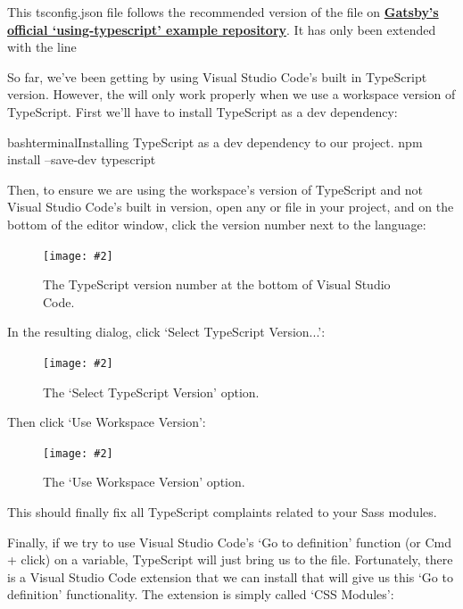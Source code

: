 \documentclass[a4paper,headinclude=on,footinclude=on,12pt,oneside]{scrbook}
\newcommand{\link}[2]{\textbf{\textcolor{monokaiPink}{\href{#2}{#1}}}}
\newcommand{\standardfigure}[3]{\begin{figure}[H]\begin{center}\texttt{[image: \#2]}\caption{#3}\label{fig:#2}\end{center}\end{figure}}
\begin{document}
This tsconfig.json file follows the recommended version of the file on \link{Gatsby's official `using-typescript' example repository}{https://github.com/gatsbyjs/gatsby/blob/master/examples/using-typescript/tsconfig.json}. It has only been extended with the  line 


So far, we've been getting by using Visual Studio Code's built in TypeScript version. However, the  will only work properly when we use a workspace version of TypeScript. First we'll have to install TypeScript as a dev dependency:

\begin{codeInput}{bash}{terminal}{Installing TypeScript as a dev dependency to our project.}
npm install --save-dev typescript
\end{codeInput}

Then, to ensure we are using the workspace's version of TypeScript and not Visual Studio Code's built in version, open any  or  file in your project, and on the bottom of the editor window, click the version number next to the language:

\standardfigure{\textwidth/2}{/frontend/visual-studio-code-version-number}{The TypeScript version number at the bottom of Visual Studio Code.}

In the resulting dialog, click `Select TypeScript Version...':

\standardfigure{\textwidth}{/frontend/select-typescript-version}{The `Select TypeScript Version' option.}

Then click `Use Workspace Version':

\standardfigure{\textwidth}{/frontend/use-workspace-version}{The `Use Workspace Version' option.}

This should finally fix all TypeScript complaints related to your Sass modules.


Finally, if we try to use Visual Studio Code's `Go to definition' function (or Cmd + click) on a variable, TypeScript will just bring us to the  file. Fortunately, there is a Visual Studio Code extension that we can install that will give us this `Go to definition' functionality. The extension is simply called `CSS Modules':
\end{document}
